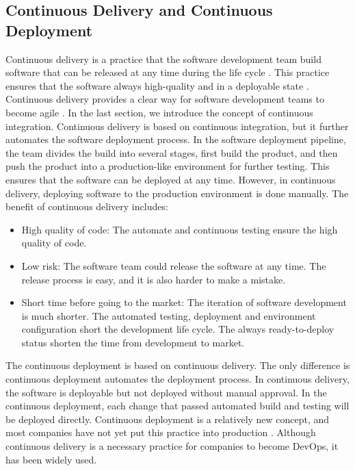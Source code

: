 \subsection{Continuous Delivery and Continuous Deployment}
\label{CD}
Continuous delivery is a practice that the software development team build software that can be released at any time during the life cycle \cite{fowler2013continuous}. This practice ensures that the software always high-quality and in a deployable state \cite{WhatisCo47:online}. Continuous delivery provides a clear way for software development teams to become agile \cite{Whyagile27:online}\cite{IsContin85:online}. In the last section, we introduce the concept of continuous integration.  Continuous delivery is based on continuous integration, but it further automates the software deployment process. In the software deployment pipeline, the team divides the build into several stages, first build the product, and then push the product into a production-like environment for further testing. This ensures that the software can be deployed at any time. However, in continuous delivery, deploying software to the production environment is done manually.
The benefit \cite{WhatisCo47:online}\cite{fowler2013continuous} of continuous delivery includes:
\begin{itemize}
    \item High quality of code: The automate and continuous testing ensure the high quality of code.
    \item Low risk: The software team could release the software at any time. The release process is easy, and it is also harder to make a mistake.
    \item Short time before going to the market: The iteration of software development is much shorter. The automated testing, deployment and environment configuration short the development life cycle. The always ready-to-deploy status shorten the time from development to market.
\end{itemize}
The continuous deployment is based on continuous delivery. The only difference is continuous deployment automates the deployment process. In continuous delivery, the software is deployable but not deployed without manual approval. In the continuous deployment, each change that passed automated build and testing will be deployed directly.
Continuous deployment is a relatively new concept, and most companies have not yet put this practice into production \cite{leppanen2015highways}. Although continuous delivery is a necessary practice for companies to become DevOps, it has been widely used.
